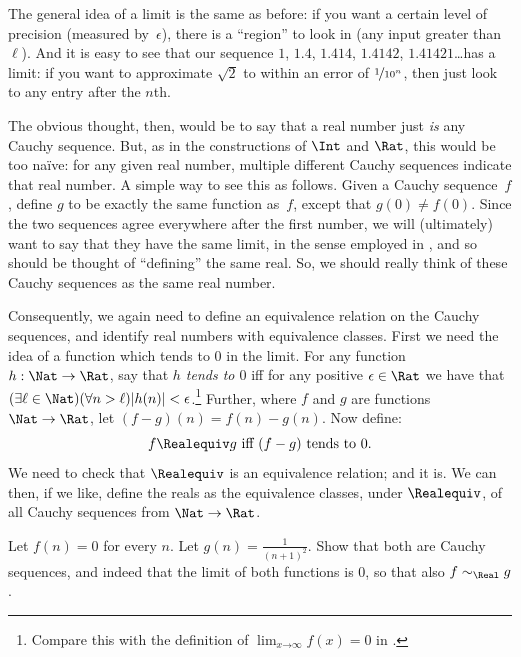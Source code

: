 \documentclass[../../../include/open-logic-section]{subfiles}
\begin{document}
The general idea of a limit is the same as before: if you want a
certain level of precision (measured by~$\epsilon$), there is a
``region'' to look in (any input greater than~$\ell$). And it is easy
to see that our sequence $1$, $1.4$, $1.414$, $1.4142$,
$1.41421$\ldots has a limit: if you want to approximate $\sqrt{2}$ to
within an error of $\nicefrac{1}{10^{n}}$, then just look to any entry
after the $n$th.

The obvious thought, then, would be to say that a real number just
\emph{is} any Cauchy sequence. But, as in the constructions of $\Int$
and $\Rat$, this would be too na\"{i}ve: for any given real number,
multiple different Cauchy sequences indicate that real number. A
simple way to see this as follows. Given a Cauchy sequence~$f$, define
$g$ to be exactly the same function as~$f$, except that $g(0)\neq
f(0)$. Since the two sequences agree everywhere after the first
number, we will (ultimately) want to say that they have the same
limit, in the sense employed in ,
and so should be thought of ``defining'' the same real. So, we should
really think of these Cauchy sequences as the same real number.

Consequently, we again need to define an equivalence relation on the
Cauchy sequences, and identify real numbers with equivalence
classes. First we need the idea of a function which tends to $0$ in
the limit. For any function $h : \Nat \to \Rat$, say that \emph{$h$
tends to $0$} iff for any positive $\epsilon \in \Rat$ we have that
$(\exists \ell \in \Nat)(\forall n > \ell)|h(n)| <
\epsilon$.\footnote{Compare this with the definition of $\lim_{x
\mathord{\rightarrow}\infty}f(x) = 0$ in
.} Further, where $f$ and $g$ are
functions $\Nat \to \Rat$, let $(f-g)(n) = f(n) - g(n)$. Now define:
\[
	f \Realequiv g \text{ iff $(f-g)$ tends to $0$}.
\]
We need to check that $\Realequiv$ is an equivalence relation; and it
is. We can then, if we like, define the reals as the equivalence
classes, under $\Realequiv$, of all Cauchy sequences from $\Nat \to
\Rat$.

\begin{prob}
Let $f(n) = 0$ for every $n$. Let $g(n) = \frac{1}{(n+1)^2}$. Show
that both are Cauchy sequences, and indeed that the limit of both
functions is $0$, so that also $f \sim_\Real g$. 
\end{prob}
\end{document}
